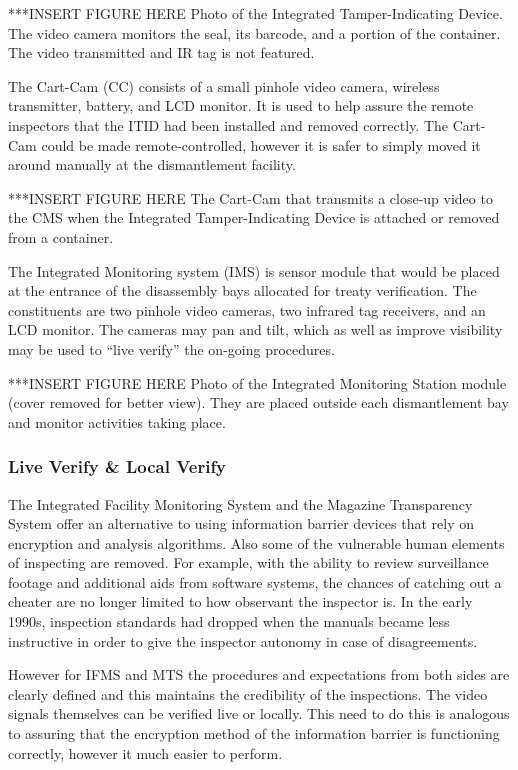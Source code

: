 \documentclass[twoside,titlepage,11pt,twocolumn,a4paper]{article}
\begin{document}
***INSERT FIGURE HERE Photo of the Integrated Tamper-Indicating 
Device. The video camera monitors the seal, its barcode, and a 
portion of the container. The video transmitted and IR tag is not 
featured. \citep{gerdes2001}

The Cart-Cam (CC) consists of a small pinhole video camera, 
wireless transmitter, battery, and LCD monitor. It is used to 
help assure the remote inspectors that the ITID had been 
installed and removed correctly. The Cart-Cam could be made 
remote-controlled, however it is safer to simply moved it 
around manually at the dismantlement facility.

***INSERT FIGURE HERE The Cart-Cam that transmits a close-up video 
to the CMS when the Integrated Tamper-Indicating Device is attached 
or removed from a container. \citep{gerdes2001}

The Integrated Monitoring system (IMS) is sensor module that would 
be placed at the entrance of the disassembly bays allocated for 
treaty verification. The constituents are two pinhole video cameras, 
two infrared tag receivers, and an LCD monitor. The cameras may pan 
and tilt, which as well as improve visibility may be used to 
``live verify'' the on-going procedures. 

***INSERT FIGURE HERE Photo of the Integrated Monitoring Station 
module (cover removed for better view). They are placed outside 
each dismantlement bay and monitor activities taking place. \citep{gerdes2001}

\subsubsection{Live Verify \& Local Verify}
The Integrated Facility Monitoring System and the Magazine Transparency 
System offer an alternative to using information barrier devices 
that rely on encryption and analysis algorithms. Also some of the 
vulnerable human elements of inspecting are removed. For example, 
with the ability to review surveillance footage and additional aids 
from software systems, the chances of catching out a cheater are no 
longer limited to how observant the inspector is.  In the early 1990s, 
inspection standards had dropped when the manuals became less 
instructive in order to give the inspector autonomy in case of 
disagreements. \citep{welch2008}

However for IFMS and MTS the procedures and expectations from both 
sides are clearly defined and this maintains the credibility of the 
inspections. The video signals themselves can be verified live or 
locally. This need to do this is analogous to assuring that the 
encryption method of the information barrier is functioning 
correctly, however it much easier to perform.
\end{document}
